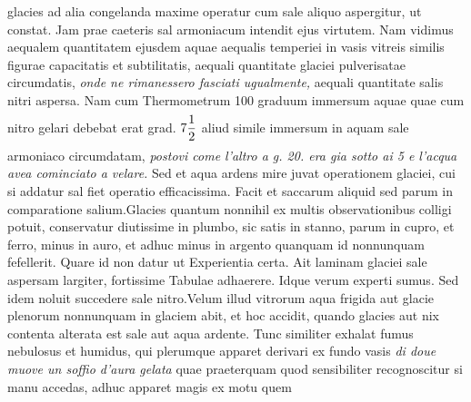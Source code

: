 \pstart {} glacies ad alia congelanda maxime operatur cum sale\protect{} aliquo aspergitur, ut constat. Jam prae caeteris sal armoniacum\protect{}  intendit ejus virtutem. Nam vidimus aequalem quantitatem ejusdem aquae  aequalis temperiei in vasis vitreis similis figurae capacitatis et subtilitatis,  aequali quantitate glaciei pulverisatae circumdatis, \textit{onde ne rimanessero  fasciati ugualmente,}  aequali  quantitate salis nitri\protect{} aspersa. Nam cum Thermometrum\protect{} 100 graduum  immersum aquae quae cum nitro\protect{} gelari debebat erat grad. $\displaystyle7\frac{1}{2}\rule[-4mm]{0mm}{10mm}$ aliud simile  immersum in aquam sale armoniaco\protect{} circumdatam, \textit{postovi come l'altro a  g. 20. era gia sotto ai 5 e l'acqua avea cominciato a velare.}  Sed et aqua ardens mire juvat operationem glaciei, cui si addatur sal\protect{}  fiet operatio efficacissima. Facit et saccarum aliquid sed parum in  comparatione salium\protect{}.\pend \pstart  Glacies quantum nonnihil ex multis observationibus colligi potuit, conservatur diutissime in plumbo\protect{}, sic satis in stanno\protect{},  parum in cupro\protect{}, et ferro\protect{}, minus in auro\protect{}, et adhuc minus in argento\protect{} quanquam  id nonnunquam fefellerit. Quare id non datur ut Experientia certa.  Ait  laminam glaciei sale\protect{} aspersam largiter, fortissime Tabulae adhaerere. Idque verum experti sumus. Sed idem noluit succedere sale\protect{} nitro\protect{}.\pend \pstart  Velum illud vitrorum aqua frigida aut glacie plenorum  nonnunquam in glaciem abit, et hoc accidit, quando glacies aut nix  contenta alterata est sale\protect{} aut aqua ardente. Tunc similiter exhalat fumus  nebulosus et humidus, qui plerumque apparet derivari ex fundo vasis \textit{di doue muove un soffio d'aura gelata} quae praeterquam quod sensibiliter  recognoscitur si manu accedas, adhuc apparet magis ex motu quem 